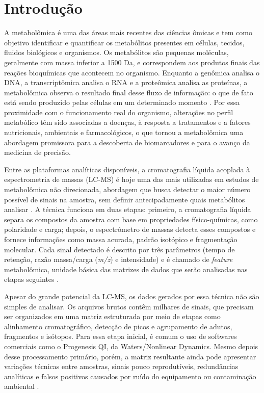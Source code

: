 % 

\chapter[Introdução]{Introdução}

A metabolômica é uma das áreas mais recentes das ciências ômicas e tem como objetivo identificar e quantificar os metabólitos presentes em células, tecidos, fluidos biológicos e organismos. Os metabólitos são pequenas moléculas, geralmente com massa inferior a 1500 Da, e correspondem aos produtos finais das reações bioquímicas que acontecem no organismo. Enquanto a genômica analisa o DNA, a transcriptômica analisa o RNA e a proteômica analisa as proteínas, a metabolômica observa o resultado final desse fluxo de informação: o que de fato está sendo produzido pelas células em um determinado momento \cite{qiu2023small}. Por essa proximidade com o funcionamento real do organismo, alterações no perfil metabólico têm sido associadas a doenças, à resposta a tratamentos e a fatores nutricionais, ambientais e farmacológicos, o que tornou a metabolômica uma abordagem promissora para a descoberta de biomarcadores e para o avanço da medicina de precisão.
 
Entre as plataformas analíticas disponíveis, a cromatografia líquida acoplada à espectrometria de massas (LC-MS) é hoje uma das mais utilizadas em estudos de metabolômica não direcionada, abordagem que busca detectar o maior número possível de sinais na amostra, sem definir antecipadamente quais metabólitos analisar \cite{schrimpe2016untargeted}. A técnica funciona em duas etapas: primeiro, a cromatografia líquida separa os compostos da amostra com base em propriedades físico-químicas, como polaridade e carga; depois, o espectrômetro de massas detecta esses compostos e fornece informações como massa acurada, padrão isotópico e fragmentação molecular. Cada sinal detectado é descrito por três parâmetros (tempo de retenção, razão massa/carga (\textit{m/z}) e intensidade) e é chamado de \textit{feature} metabolômica, unidade básica das matrizes de dados que serão analisadas nas etapas seguintes \cite{chen2022guide}.
 
Apesar do grande potencial da LC-MS, os dados gerados por essa técnica não são simples de analisar. Os arquivos brutos contêm milhares de sinais, que precisam ser organizados em uma matriz estruturada por meio de etapas como alinhamento cromatográfico, detecção de picos e agrupamento de adutos, fragmentos e isótopos. Para essa etapa inicial, é comum o uso de softwares comerciais como o Progenesis QI, da Waters/Nonlinear Dynamics. Mesmo depois desse processamento primário, porém, a matriz resultante ainda pode apresentar variações técnicas entre amostras, sinais pouco reprodutíveis, redundâncias analíticas e falsos positivos causados por ruído do equipamento ou contaminação ambiental \cite{schiffman2019filtering}.
 
